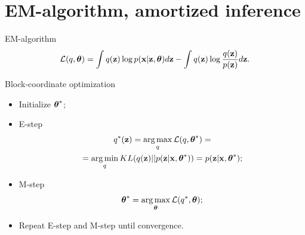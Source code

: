 \section{EM-algorithm, amortized inference}
\begin{frame}{EM-algorithm}
	\[
		\mathcal{L} (q, \boldsymbol{\theta})  = \int q(\mathbf{z}) \log p(\mathbf{x} | \mathbf{z}, \boldsymbol{\theta}) d\mathbf{z} - \int q(\mathbf{z}) \log \frac{q(\mathbf{z})}{p(\mathbf{z})}d\mathbf{z}.
	\]
	\begin{block}{Block-coordinate optimization}
	\begin{itemize}
		\item Initialize $\boldsymbol{\theta}^*$;
		\item E-step
		\begin{multline*}
			q^*(\mathbf{z}) = \operatorname*{arg\,max}_q \mathcal{L} (q, \boldsymbol{\theta}^*) = \\
			= \operatorname*{arg\,min}_q KL(q(\mathbf{z}) || p(\mathbf{z} | \mathbf{x}, \boldsymbol{\theta}^*)) = p(\mathbf{z}| \mathbf{x}, \boldsymbol{\theta}^*);
		\end{multline*}
		\item M-step
		\[
			\boldsymbol{\theta}^* = \operatorname*{arg\,max}_{\boldsymbol{\theta}} \mathcal{L} (q^*, \boldsymbol{\theta});
		\]
		\item Repeat E-step and M-step until convergence.
	\end{itemize}
	\end{block}
\end{frame}
